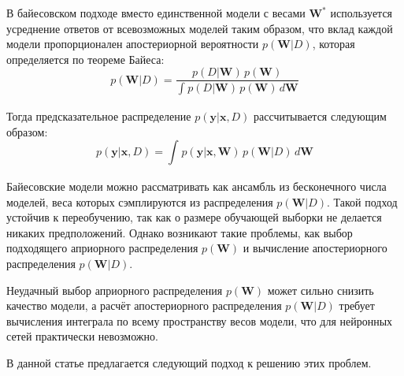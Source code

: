 \documentclass{article}
\numberwithin{equation}{section}
\begin{document}
    В байесовском подходе вместо единственной модели с весами $\pmb{W}^*$
    используется усреднение ответов от всевозможных моделей таким образом,
    что вклад каждой модели пропорционален апостериорной вероятности $p(\pmb{W}| D)$,
    которая определяется по теореме Байеса:
    \begin{equation}
        p(\pmb{W}| D)
        =
        \frac
            {
                p(D | \pmb{W})
                \,
                p(\pmb{W})
            }
            {
                \int_{}{
                    p(D | \pmb{W})
                    \,
                    p(\pmb{W})
                    \,
                    d\pmb{W}
                }
            }
    \end{equation}

    Тогда предсказательное распределение $p(\pmb{y} | \pmb{x}, D)$ рассчитывается следующим образом:
    \begin{equation}
        p(\pmb{y} | \pmb{x}, D)
        =
        \int_{}{
            p(\pmb{y} | \pmb{x}, \pmb{W})
            \,
            p(\pmb{W} | D)
            \,
            d\pmb{W}
        }
    \end{equation}

    Байесовские модели можно рассматривать как ансамбль из бесконечного числа моделей,
    веса которых сэмплируются из распределения
    $p(\pmb{W}| D)$.
    Такой подход устойчив к переобучению, так как о размере обучающей выборки не делается никаких предположений.
    Однако возникают такие проблемы, как выбор подходящего априорного распределения
    $p(\pmb{W})$
    и вычисление апостериорного распределения
    $p(\pmb{W}| D)$.

    Неудачный выбор априорного распределения $p(\pmb{W})$ может сильно снизить качество модели,
    а расчёт апостериорного распределения $p(\pmb{W}| D)$
    требует вычисления интеграла по всему пространству весов модели,
    что для нейронных сетей практически невозможно.

    В данной статье предлагается следующий подход к решению этих проблем.
\end{document}
